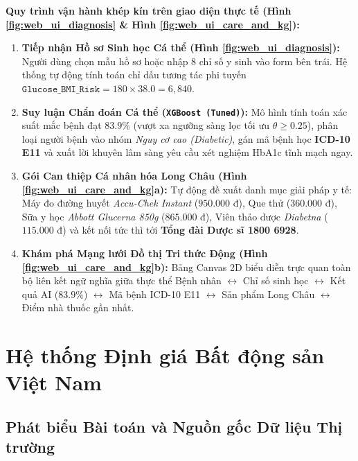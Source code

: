 \documentclass[12pt,a4paper]{report}
\begin{document}
\textbf{Quy trình vận hành khép kín trên giao diện thực tế (Hình \ref{fig:web_ui_diagnosis} \& Hình \ref{fig:web_ui_care_and_kg}):}
\begin{enumerate}[leftmargin=1.5em]
    \item \textbf{Tiếp nhận Hồ sơ Sinh học Cá thể (Hình \ref{fig:web_ui_diagnosis}):} Người dùng chọn mẫu hồ sơ hoặc nhập 8 chỉ số y sinh vào form bên trái. Hệ thống tự động tính toán chỉ dấu tương tác phi tuyến $\texttt{Glucose\_BMI\_Risk} = 180 \times 38.0 = 6,840$.
    \item \textbf{Suy luận Chẩn đoán Cá thể (\texttt{XGBoost (Tuned)}):} Mô hình tính toán xác suất mắc bệnh đạt $\mathbf{83.9\%}$ (vượt xa ngưỡng sàng lọc tối ưu $\theta \ge 0.25$), phân loại người bệnh vào nhóm \textit{Nguy cơ cao (Diabetic)}, gán mã bệnh học \textbf{ICD-10 E11} và xuất lời khuyên lâm sàng yêu cầu xét nghiệm HbA1c tĩnh mạch ngay.
    \item \textbf{Gói Can thiệp Cá nhân hóa Long Châu (Hình \ref{fig:web_ui_care_and_kg}a):} Tự động đề xuất danh mục giải pháp y tế: Máy đo đường huyết \textit{Accu-Chek Instant} ($950.000$ đ), Que thử ($360.000$ đ), Sữa y học \textit{Abbott Glucerna 850g} ($865.000$ đ), Viên thảo dược \textit{Diabetna} ($115.000$ đ) và kết nối tức thì tới \textbf{Tổng đài Dược sĩ 1800 6928}.
    \item \textbf{Khám phá Mạng lưới Đồ thị Tri thức Động (Hình \ref{fig:web_ui_care_and_kg}b):} Bảng Canvas 2D biểu diễn trực quan toàn bộ liên kết ngữ nghĩa giữa thực thể Bệnh nhân $\longleftrightarrow$ Chỉ số sinh học $\longleftrightarrow$ Kết quả AI ($83.9\%$) $\longleftrightarrow$ Mã bệnh ICD-10 E11 $\longleftrightarrow$ Sản phẩm Long Châu $\longleftrightarrow$ Điểm nhà thuốc gần nhất.
\end{enumerate}

\chapter{Hệ thống Định giá Bất động sản Việt Nam}

\section{Phát biểu Bài toán và Nguồn gốc Dữ liệu Thị trường}
\end{document}
